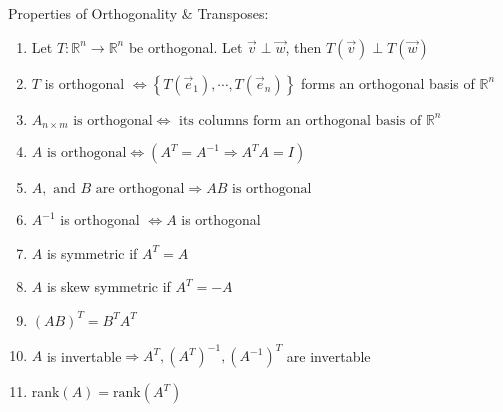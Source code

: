 \documentclass[11pt]{article}
\begin{document}
\noindent
Properties of Orthogonality \& Transposes:
\begin{enumerate}
\item Let $T:\mathbb{R}^n\rightarrow\mathbb{R}^n$ be orthogonal. Let $\vec{v}\perp\vec{w}$, then $T(\vec{v})\perp T(\vec{w})$
\item $T$ is orthogonal $\Leftrightarrow\left\lbrace T(\vec{e}_1),\cdots,T(\vec{e}_n)\right\rbrace$ forms an orthogonal basis of $\mathbb{R}^n$
\item $A_{n\times m}\text{ is orthogonal}\Leftrightarrow\text{ its columns form an orthogonal basis of }\mathbb{R}^n$
\item $A\text{ is orthogonal}\Leftrightarrow (A^T=A^{-1}\Rightarrow A^TA=I)$
\item $A,\text{ and }B\text{ are orthogonal}\Rightarrow AB\text{ is orthogonal}$
\item $A^{-1}$ is orthogonal $\Leftrightarrow A$ is orthogonal
\item $A$ is symmetric if $A^T=A$
\item $A$ is skew symmetric if $A^T=-A$
\item $(AB)^T=B^TA^T$
\item $A$ is invertable$\Rightarrow A^T,(A^T)^{-1},(A^{-1})^T$ are invertable
\item rank$(A)=\text{rank}(A^T)$
\end{enumerate}
\end{document}
